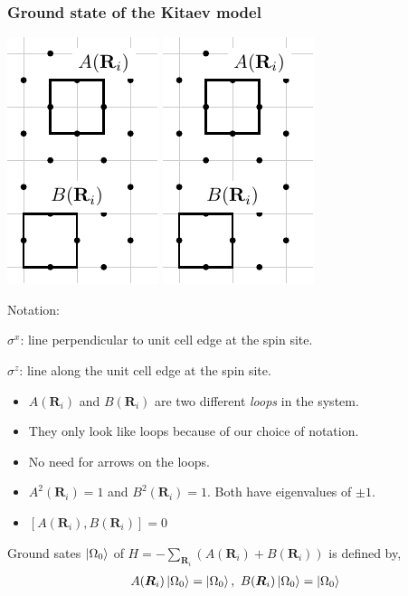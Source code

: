 \documentclass{beamer}
\renewcommand{\(}{\left(}
\renewcommand{\)}{\right)}
\renewcommand{\[}{\left[}
\renewcommand{\]}{\right]}
\begin{document}
\begin{frame}
    \frametitle{Ground state of the Kitaev model}
    \begin{center}
        \includegraphics[scale = 1, trim=0 65 0 0,clip]{elementry_loops.pdf} \quad \quad 
        \includegraphics[scale = 1, trim=0 8 0 65,clip]{elementry_loops.pdf}
    \end{center}
    Notation: 
    
    $\sigma^x$: line perpendicular to unit cell edge at the spin site.

    $\sigma^z$: line along the unit cell edge at the spin site.
    \pause
    \begin{itemize}
        \item $A(\bm R_i)$ and $B(\bm R_i)$ are two different \emph{loops} in the system. 
        \item They only look like loops because of our choice of notation.
        \item No need for arrows on the loops.
        \item $A^2(\bm R_i) = 1$ and $B^2(\bm R_i) = 1$. Both have eigenvalues of $\pm 1$.
        \item $\[A(\bm R_i), B(\bm R_i)\] = 0$
    \end{itemize}
    \pause
    Ground sates $\ket{\Omega_0}$ of $H = -\sum_{\bm R_i} \(A(\bm R_i)  + B(\bm R_i) \)$ is defined by, 
    \begin{align*}
        A(\bm R_i)\ket{\Omega_0} = \ket{\Omega_0}, \  B(\bm R_i)\ket{\Omega_0} = \ket{\Omega_0}
    \end{align*}
\end{frame}
\end{document}
